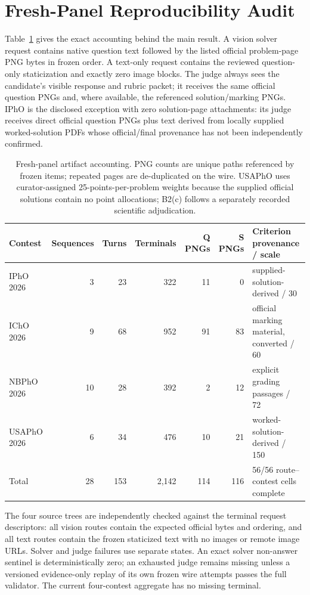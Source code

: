 \documentclass[11pt]{article}
\begin{document}
\section{Fresh-Panel Reproducibility Audit}
\label{app:fresh-audit}

Table~\ref{tab:fresh-artifact-accounting} gives the exact accounting behind the main result. A vision solver request contains native question text followed by the listed official problem-page PNG bytes in frozen order. A text-only request contains the reviewed question-only staticization and exactly zero image blocks. The judge always sees the candidate's visible response and rubric packet; it receives the same official question PNGs and, where available, the referenced solution/marking PNGs. IPhO is the disclosed exception with zero solution-page attachments: its judge receives direct official question PNGs plus text derived from locally supplied worked-solution PDFs whose official/final provenance has not been independently confirmed.

\begin{table}[t]
\centering
\small
\setlength{\tabcolsep}{6pt}
\begin{tabular}{lrrrrrl}
\toprule
\textbf{Contest} & \textbf{Sequences} & \textbf{Turns} & \textbf{Terminals} & \textbf{Q PNGs} & \textbf{S PNGs} & \textbf{Criterion provenance / scale} \\
\midrule
IPhO 2026 & 3 & 23 & 322 & 11 & 0 & supplied-solution-derived / 30 \\
IChO 2026 & 9 & 68 & 952 & 91 & 83 & official marking material, converted / 60 \\
NBPhO 2026 & 10 & 28 & 392 & 2 & 12 & explicit grading passages / 72 \\
USAPhO 2026 & 6 & 34 & 476 & 10 & 21 & worked-solution-derived / 150 \\
\midrule
Total & 28 & 153 & 2,142 & 114 & 116 & 56/56 route--contest cells complete \\
\bottomrule
\end{tabular}
\caption{Fresh-panel artifact accounting. PNG counts are unique paths referenced by frozen items; repeated pages are de-duplicated on the wire. USAPhO uses curator-assigned 25-points-per-problem weights because the supplied official solutions contain no point allocations; B2(c) follows a separately recorded scientific adjudication.}
\label{tab:fresh-artifact-accounting}
\end{table}

The four source trees are independently checked against the terminal request descriptors: all vision routes contain the expected official bytes and ordering, and all text routes contain the frozen staticized text with no images or remote image URLs. Solver and judge failures use separate states. An exact solver non-answer sentinel is deterministically zero; an exhausted judge remains missing unless a versioned evidence-only replay of its own frozen wire attempts passes the full validator. The current four-contest aggregate has no missing terminal.
\end{document}
